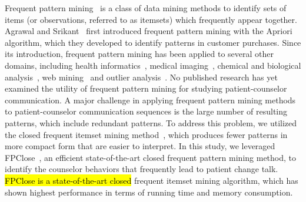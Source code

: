 Frequent pattern mining~\cite{aggarwal2014frequent} is a class of data mining methods to identify sets of items (or observations, referred to as itemsets) which frequently appear together. Agrawal and Srikant~\cite{agrawal1994fast} first introduced frequent pattern mining with the Apriori algorithm, which they developed to identify patterns in customer purchases. Since its introduction, frequent pattern mining has been applied to several other domains, including health informatics~\cite{abdullah2008analysis, olukunle2002fast, bethel2006mining, wright2015use}, medical imaging~\cite{olukunle2002fast}, chemical and biological analysis~\cite{deshpande2005frequent, leach2007introduction, zhang2008discovering}, web mining~\cite{srivastava2000web} and outlier analysis~\cite{aggarwal2015outlier}. No published research has yet examined the utility of frequent pattern mining for studying patient-counselor communication. A major challenge in applying frequent pattern mining methods to patient-counselor communication sequences is the large number of resulting patterns, which include redundant patterns. To address this problem, we utilized the closed frequent itemset mining method~\cite{pasquier1999discovering}, which produces fewer patterns in more compact form that are easier to interpret. In this study, we leveraged FPClose~\cite{grahne2005fast}, an efficient state-of-the-art closed frequent pattern mining method, to identify the counselor behaviors that frequently lead to patient change talk. \hl{FPClose is a state-of-the-art closed} frequent itemset mining algorithm, which has shown highest performance in terms of running time and memory consumption.

